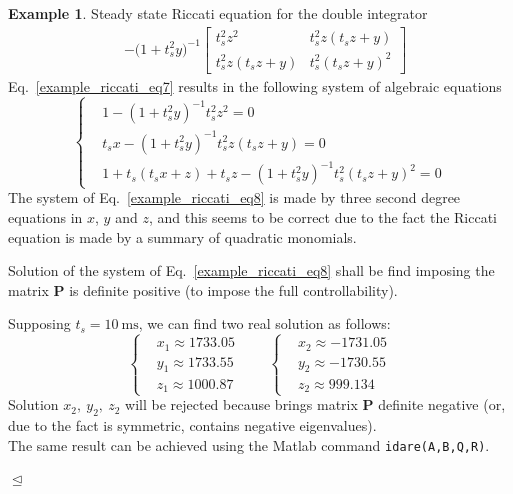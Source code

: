 \documentclass[11pt,a4paper,oneside]{book}
\numberwithin{equation}{section}
\theoremstyle{it}
\theoremstyle{definition}
\newtheorem{example}{Example}[chapter]
\begin{document}
\begin{example}{Steady state Riccati equation for the double integrator}
\begin{equation}
\begin{aligned}
		&-\Big(1+t_s^2y\Big)^{-1}\begin{bmatrix}t_s^2z^2 & t_s^2z(t_sz+y) \\ t_s^2z(t_sz+y) & t_s^2(t_sz+y)^2\end{bmatrix}
	\end{aligned}
\end{equation}
Eq.~\eqref{example_riccati_eq7} results in the following system of algebraic equations
\begin{equation}\label{example_riccati_eq8}
	\left\lbrace \begin{aligned}
		&	1 - (1+t_s^2y)^{-1}t_s^2z^2=0 \\[6pt]
		&	t_sx - (1+t_s^2y)^{-1}t_s^2z(t_sz+y) = 0 \\[6pt]
		&	1 + t_s(t_sx+z)+t_sz- (1+t_s^2y)^{-1}t_s^2(t_sz+y)^2=0
	\end{aligned}\right. 
\end{equation}
The system of Eq.~\eqref{example_riccati_eq8} is made by three second degree equations in 
$x$, $y$ and $z$, and this seems to be correct due to the fact the Riccati 
equation is made by a summary of quadratic monomials. 

Solution of the system of Eq.~\eqref{example_riccati_eq8} shall be find imposing the 
matrix $\mathbf{P}$ is definite positive (to impose the full controllability). 

Supposing $t_s=\SI{10}{\milli\second}$, we can find two real solution as 
follows:
\begin{equation}\label{riccati_7}
	\left\lbrace \begin{aligned}
		&	x_1 \approx 1733.05 \\[6pt]
		&	y_1 \approx 1733.55 \\[6pt]
		&	z_1 \approx 1000.87
	\end{aligned}\right. \qquad
	\left\lbrace \begin{aligned}
		&	x_2 \approx -1731.05 \\[6pt]
		&	y_2 \approx -1730.55 \\[6pt]
		&	z_2 \approx 999.134
	\end{aligned}\right. 
\end{equation}
Solution $x_2,\ y_2,\ z_2$ will be rejected because brings matrix $\mathbf{P}$ 
definite negative (or, due to the fact is symmetric, contains negative 
eigenvalues). \\

The same result can be achieved using the Matlab command 
\texttt{idare(A,B,Q,R)}.

$\trianglelefteq$
\end{example}
\end{document}
